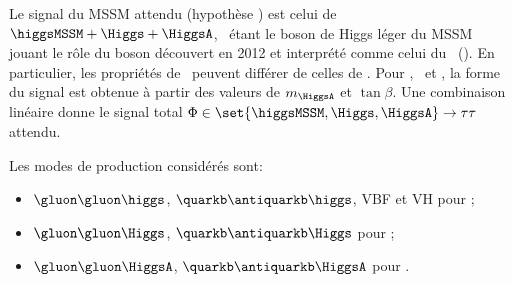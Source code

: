 \par
Le signal du MSSM attendu (hypothèse \hypSB) est celui de $\higgsMSSM+\Higgs+\HiggsA$, \higgsMSSM\ étant le boson de Higgs léger du MSSM jouant le rôle du boson découvert en 2012 et interprété comme celui du \SM\ (\higgsSM).
En particulier, les propriétés de \higgsMSSM\ peuvent différer de celles de \higgsSM.
Pour \higgsMSSM, \Higgs\ et \HiggsA, la forme du signal est obtenue à partir des valeurs de $m_{\HiggsA}$ et $\tan\beta$.
Une combinaison linéaire donne le signal total $\Phi\in\set{\higgsMSSM,\Higgs,\HiggsA}\to\tau\tau$ attendu.
\par
Les modes de production considérés sont:
\begin{itemize}
\item $\gluon\gluon\higgs$, $\quarkb\antiquarkb\higgs$, VBF et VH pour \higgsMSSM;
\item $\gluon\gluon\Higgs$, $\quarkb\antiquarkb\Higgs$ pour \Higgs;
\item $\gluon\gluon\HiggsA$, $\quarkb\antiquarkb\HiggsA$ pour \HiggsA.
\end{itemize}
